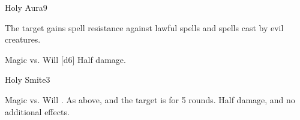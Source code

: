 \begin{spellsection}{Holy Aura}{9}
\begin{spellheader}
\end{spellheader}
\begin{spellcontent}
    \begin{spelltargetinginfo}
    \end{spelltargetinginfo}
    \begin{spelleffects}
        \spelleffect The target gains spell resistance against lawful spells and spells cast by evil creatures.
        \spelldur \durshort \dismissable
    \end{spelleffects}
\end{spellcontent}
\begin{spellsubcontent}
    \begin{spelltargetinginfo}
    \end{spelltargetinginfo}
    \begin{spelleffects}
        \begin{spellattack}{Magic vs. Will}
            \spellsuccess {}[d6]
            \spellfailure Half damage.
        \end{spellattack}
    \end{spelleffects}
\end{spellsubcontent}
\begin{spellfooter}
\end{spellfooter}
\end{spellsection}

\begin{spellsection}{Holy Smite}{3}
\begin{spellheader}
\end{spellheader}
\begin{spellcontent}
    \begin{spelltargetinginfo}
    \end{spelltargetinginfo}
    \begin{spelleffects}
        \begin{spellattack}{Magic vs. Will}
            \spellsuccess {}.
            \spellcritical As above, and the target is \dazed for 5 rounds.
            \spellfailure Half damage, and no additional effects.
        \end{spellattack}
    \end{spelleffects}
\end{spellcontent}
\begin{spellfooter}
\end{spellfooter}
\end{spellsection}

